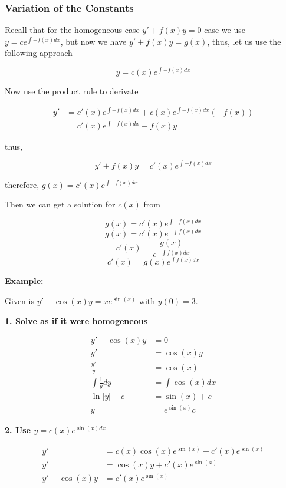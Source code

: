 \subsubsection{Variation of the Constants}

Recall that for the homogeneous case \(y' + f(x)y = 0\) case we use 
\(y = c e^{\int -f(x) dx}\), but now we have \(y' + f(x)y = g(x)\), thus, let us use the following
approach

\[
    y = c(x) e^{\int -f(x) dx}
\]

Now use the product rule to derivate

\begin{align*}
    y' &= c'(x) e^{\int -f(x) dx} + c(x)e^{\int -f(x) dx}(-f(x))\\
    &= c'(x)e^{\int -f(x) dx} - f(x)y
\end{align*}

thus, 

\[
    y' + f(x)y = c'(x)e^{\int -f(x) dx}
\]

therefore, \(g(x) = c'(x)e^{\int -f(x) dx}\)

Then we can get a solution for \(c(x)\) from

\[
    g(x) = c'(x)e^{\int -f(x) dx}
\]
\[
    g(x) = c'(x)e^{-\int f(x) dx}
\]
\[
    c'(x) = \frac{g(x)}{e^{-\int f(x) dx}}
\]
\[
    c'(x) = g(x)e^{\int f(x) dx}
\]

\textbf{Example: }

Given is \(y' -\cos(x)y = x e^{\sin(x)}\) with \(y(0) = 3\).

\textbf{1. Solve as if it were homogeneous}

\begin{align*}
    y' -\cos(x)y &= 0\\
    y' &= \cos(x)y\\
    \frac{y'}{y} &= \cos(x)\\
    \int\frac{1}{y}dy &= \int \cos(x)dx \\
    \ln |y| + c &= \sin(x) + c \\
    y &= e^{\sin(x)}c 
\end{align*}

\textbf{2. Use \(y = c(x)e^{\sin(x)dx}\)}

\begin{align*}
    y' &= c(x)\cos(x)e^{\sin(x)} + c'(x)e^{\sin(x)}\\
    y' &= \cos(x)y + c'(x)e^{\sin(x)}\\
    y' - \cos(x)y &= c'(x)e^{\sin(x)}
\end{align*}
    
